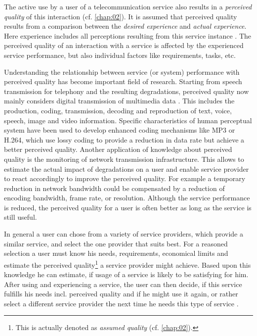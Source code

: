 The active use by a user of a telecommunication service also results in a \emph{perceived quality} of this interaction (cf. \autoref{chap:02}).
It is assumed that perceived quality results from a comparison between the \emph{desired experience} and \emph{actual experience}. %
Here experience includes all perceptions resulting from this service instance \citep[cf.][p.13]{Book chapter 2}.
The perceived quality of an interaction with a service is affected by the experienced service performance, but also individual factors like requirements, tasks, etc.

Understanding the relationship between service (or system) performance with perceived quality has become important field of research.
Starting from speech transmission for telephony \citep[cf.][]{IEEE Recommended Practice for Speech Quality Measurements} and the resulting degradations, perceived quality now mainly considers digital transmission of multimedia data \citep{moller_quality_2014}.
This includes the production, coding, transmission, decoding and reproduction of text, voice, speech, image and video information.
Specific characteristics of human perceptual system have been used to develop enhanced coding mechanisms like \ac{MP3} or \ac{H.264}, which use lossy coding to provide a reduction in data rate but achieve a better perceived quality.
Another application of knowledge about perceived quality is the monitoring of network transmission infrastructure.
This allows to estimate the actual impact of degradations on a user and enable service provider to react accordingly to improve the perceived quality.
For example a temporary reduction in network bandwidth could be compensated by a reduction of encoding bandwidth, frame rate, or resolution.
Although the service performance is reduced, the perceived quality for a user is often better as long as the service is still useful.

In general a user can chose from a variety of service providers, which provide a similar service, and select the one provider that suits best.
For a reasoned selection a user must know his needs, requirements, economical limits and estimate the perceived quality\footnote{This is actually denoted as \emph{assumed quality} (cf. \autoref{chap:02}).} a service provider might achieve.
Based upon this knowledge he can estimate, if usage of a service is likely to be satisfying for him.
After using and experiencing a service, the user can then decide, if this service fulfills his needs incl. perceived quality and if he might use it again, or rather select a different service provider the next time he needs this type of service \citep[cf.][]{geerts_linking_2010}.

